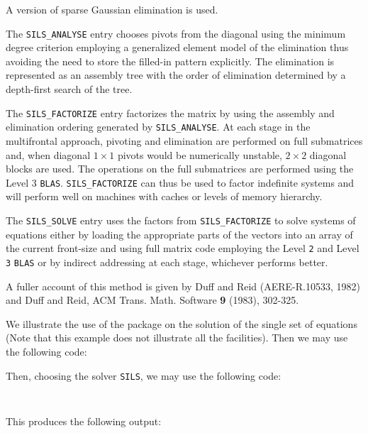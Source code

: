 \documentclass{galahad}
\newcommand{\packagename}{SILS}
\begin{document}

\galmethod
A version of sparse Gaussian elimination is used. 
 

The {\tt \packagename\_ANALYSE} entry chooses pivots from the 
 diagonal using the minimum degree criterion employing a 
 generalized element model of the elimination thus avoiding the 
 need to store the filled-in pattern explicitly.  The 
 elimination is represented as an assembly tree 
 with the order of elimination determined by a depth-first 
 search of the tree. 
 

The {\tt \packagename\_FACTORIZE} entry factorizes the matrix by using the 
 assembly and elimination ordering generated by {\tt \packagename\_ANALYSE}.  At 
 each stage in the multifrontal approach, pivoting and 
 elimination are performed on full submatrices and, when 
 diagonal $1 \times 1$ pivots would be numerically unstable, $2 \times 2$ 
 diagonal blocks are used.  The operations on the full submatrices 
 are performed using the Level 3 {\tt BLAS}.  {\tt \packagename\_FACTORIZE} 
 can thus be  used to 
 factor indefinite systems and will perform well on machines 
 with caches or levels of memory hierarchy. 
 

The {\tt \packagename\_SOLVE} entry uses the factors from 
{\tt \packagename\_FACTORIZE} to solve 
 systems of equations either by loading the appropriate parts of 
 the vectors into an  array  of the current front-size and 
 using full matrix code employing the Level {\tt 2} and Level {\tt 3} 
{\tt BLAS} 
 or by indirect addressing at each stage, 
 whichever performs better. 
 

\galreference
A fuller account of this method is given by Duff and Reid 
(AERE-R.10533, 1982) and Duff and Reid, ACM Trans. Math. 
Software {\bf 9} (1983), 302-325. 
 


\galexample
We illustrate the use of the package on the solution of the 
single set of equations 
(Note that this example does not illustrate all the facilities). 
Then we may use the following code:

Then, choosing the solver {\tt SILS}, we may use the following code:

{\tt \small
\VerbatimInput{\packageexample}
}
\noindent

This produces the following output:
{\tt \small
\VerbatimInput{\packageresults}
}
\end{document}
